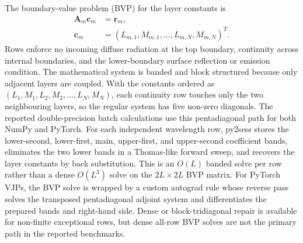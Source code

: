 \documentclass[gmd, manuscript]{copernicus}
\begin{document}
The boundary-value problem (BVP) for the layer constants is
\begin{equation}
  \begin{aligned}
  \mathbf{A}_m\mathbf{c}_m &= \mathbf{r}_m,\\
  \mathbf{c}_m &=
  (L_{m,1},M_{m,1},\ldots,L_{m,N},M_{m,N})^T .
  \end{aligned}
  \label{eq:bvp}
\end{equation}
Rows enforce no incoming diffuse radiation at the top boundary, continuity across
internal boundaries, and the lower-boundary surface reflection or emission condition.
The mathematical system is banded and block structured because only adjacent layers are
coupled.  With the constants ordered as
$(L_1,M_1,L_2,M_2,\ldots,L_N,M_N)$, each continuity row touches only the two
neighbouring layers, so the regular system has five non-zero diagonals.  The reported
double-precision batch calculations use this pentadiagonal path for both NumPy and
PyTorch.  For each independent wavelength row, py2sess stores the lower-second,
lower-first, main, upper-first, and upper-second coefficient bands, eliminates the two
lower bands in a Thomas-like forward sweep, and recovers the layer constants by
back substitution.  This is an $O(L)$ banded solve per row rather than a dense
$O(L^3)$ solve on the $2L\times2L$ BVP matrix.  For PyTorch VJPs, the BVP solve is
wrapped by a custom autograd rule whose reverse pass solves the transposed
pentadiagonal adjoint system and differentiates the prepared bands and right-hand side.
Dense or block-tridiagonal repair is available for non-finite exceptional rows, but
dense all-row BVP solves are not the primary path in the reported benchmarks.
\end{document}
